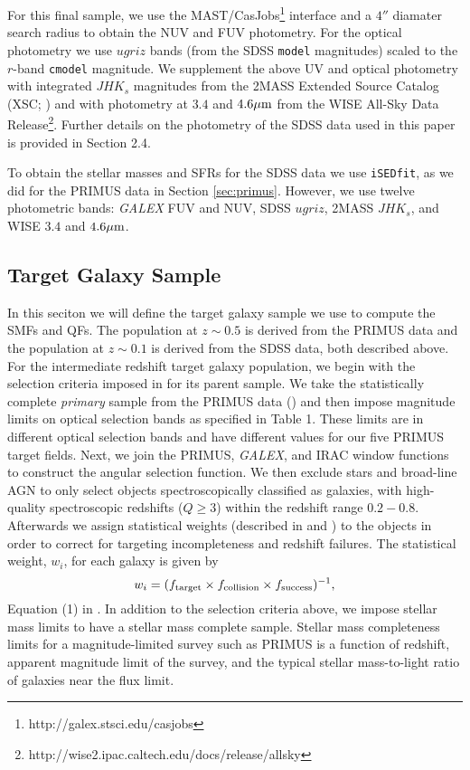 \documentclass{emulateapj}
\begin{document}
For this final sample, we use the MAST/CasJobs\footnote{http://galex.stsci.edu/casjobs} interface and a $4''$ diamater search radius to obtain the NUV and FUV photometry. 
For the optical photometry we use $ugriz$ bands (from the SDSS \texttt{model} magnitudes) scaled to the $r$-band \texttt{cmodel} magnitude. 
We supplement the above UV and optical photometry with integrated $JHK_s$ magnitudes from the 2MASS Extended Source Catalog (XSC; \cite{Jarrett:2000aa}) and with photometry at $3.4$ 
and $4.6 \mu \rm{m}$ from the WISE All-Sky Data Release\footnote{http://wise2.ipac.caltech.edu/docs/release/allsky}. 
Further details on the photometry of the SDSS data used in this paper is provided in \cite{Moustakas:2013aa} Section 2.4. 

To obtain the stellar masses and SFRs for the SDSS data we use \texttt{iSEDfit}, as we did for the PRIMUS data in Section \ref{sec:primus}.  
However, we use twelve photometric bands: {\em GALEX} FUV and NUV, SDSS $ugriz$, 2MASS $JHK_{s}$, and WISE $3.4$ and $4.6 \mu \rm{m}$.

\subsection{Target Galaxy Sample} \label{sec:target} 
In this seciton we will define the target galaxy sample we use to compute the SMFs and QFs.
The population at $z \sim 0.5$ is derived from the PRIMUS data and the population at $z \sim 0.1$ is derived from the SDSS data, both described above.
For the intermediate redshift target galaxy population, we begin with the selection criteria imposed in \cite{Moustakas:2013aa} for its parent sample.
We take the statistically complete {\em primary} sample from the PRIMUS data (\cite{Coil:2011aa}) and then impose magnitude limits on optical selection bands as specified in 
\cite{Moustakas:2013aa} Table 1.
These limits are in different optical selection bands and have different values for our five PRIMUS target fields.
Next, we join the PRIMUS, {\em GALEX}, and IRAC window functions to construct the angular selection function.
We then exclude stars and broad-line AGN to only select objects spectroscopically classified as galaxies, with high-quality spectroscopic redshifts ($Q \geq 3$) within the 
redshift range $0.2 - 0.8$.
Afterwards we assign statistical weights (described in \cite{Coil:2011aa} and \cite{Cool:2013aa}) to the objects in order to correct for targeting incompleteness and redshift failures.
The statistical weight, $w_i$, for each galaxy is given by
\begin{equation}
w_{i} = (f_{\rm{target}} \times f_{\rm{collision}} \times f_{\rm{success}})^{-1},
\end{equation}
Equation (1) in \cite{Moustakas:2013aa}.
In addition to the selection criteria above, we impose stellar mass limits to have a stellar mass complete sample.  
Stellar mass completeness limits for a magnitude-limited survey such as PRIMUS is a function of redshift, apparent magnitude limit of the survey, and the typical stellar 
mass-to-light ratio of galaxies near the flux limit.
\end{document}
